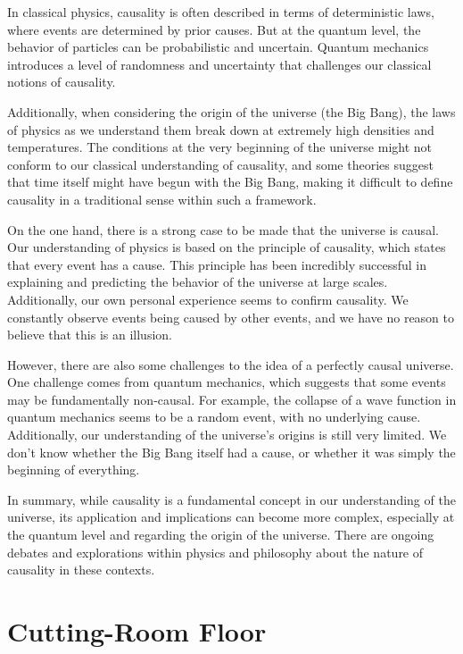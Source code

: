 \documentclass[10]{article}
\begin{document}
In classical physics, causality is often described in terms of
deterministic laws, where events are determined by prior causes.
But at the quantum level, the behavior of particles can be probabilistic
and uncertain.
Quantum mechanics introduces a level of randomness and uncertainty that
challenges our classical notions of causality.

Additionally, when considering the origin of the universe (the Big Bang),
the laws of physics as we understand them break down at extremely high
densities and temperatures.
The conditions at the very beginning of the universe might not conform
to our classical understanding of causality, and some theories suggest
that time itself might have begun with the Big Bang, making it difficult
to define causality in a traditional sense within such a framework.

On the one hand, there is a strong case to be made that the universe
is causal.
Our understanding of physics is based on the principle of causality,
which states that every event has a cause.
This principle has been incredibly successful in explaining and predicting
the behavior of the universe at large scales.
Additionally, our own personal experience seems to confirm causality.
We constantly observe events being caused by other events, and we have
no reason to believe that this is an illusion.

However, there are also some challenges to the idea of a perfectly
causal universe.
One challenge comes from quantum mechanics, which suggests that some
events may be fundamentally non-causal.
For example, the collapse of a wave function in quantum mechanics seems
to be a random event, with no underlying cause.
Additionally, our understanding of the universe's origins is still
very limited.
We don't know whether the Big Bang itself had a cause, or whether it
was simply the beginning of everything.

In summary, while causality is a fundamental concept in our understanding
of the universe, its application and implications can become more complex,
especially at the quantum level and regarding the origin of the universe.
There are ongoing debates and explorations within physics and philosophy
about the nature of causality in these contexts.

\section{Cutting-Room Floor}
\label{sec:Cutting-Room Floor}
\end{document}
